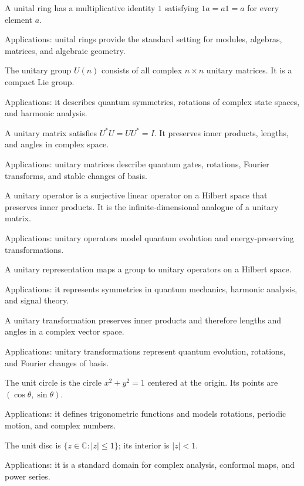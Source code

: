 A unital ring has a multiplicative identity $1$ satisfying $1a=a1=a$ for every element $a$. \par\noindent Applications: unital rings provide the standard setting for modules, algebras, matrices, and algebraic geometry.

The unitary group $U(n)$ consists of all complex $n\times n$ unitary matrices. It is a compact Lie group. \par\noindent Applications: it describes quantum symmetries, rotations of complex state spaces, and harmonic analysis.

A unitary matrix satisfies $U^*U=UU^*=I$. It preserves inner products, lengths, and angles in complex space. \par\noindent Applications: unitary matrices describe quantum gates, rotations, Fourier transforms, and stable changes of basis.

A unitary operator is a surjective linear operator on a Hilbert space that preserves inner products. It is the infinite-dimensional analogue of a unitary matrix. \par\noindent Applications: unitary operators model quantum evolution and energy-preserving transformations.

A unitary representation maps a group to unitary operators on a Hilbert space. \par\noindent Applications: it represents symmetries in quantum mechanics, harmonic analysis, and signal theory.

A unitary transformation preserves inner products and therefore lengths and angles in a complex vector space. \par\noindent Applications: unitary transformations represent quantum evolution, rotations, and Fourier changes of basis.

The unit circle is the circle $x^2+y^2=1$ centered at the origin. Its points are $(\cos\theta,\sin\theta)$. \par\noindent Applications: it defines trigonometric functions and models rotations, periodic motion, and complex numbers.

The unit disc is $\{z\in\mathbb C:|z|\leq1\}$; its interior is $|z|<1$. \par\noindent Applications: it is a standard domain for complex analysis, conformal maps, and power series.

